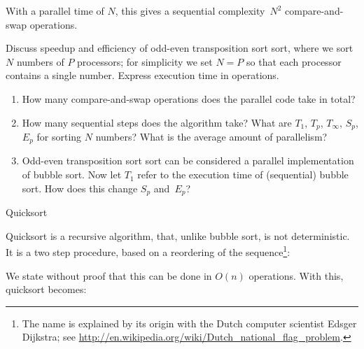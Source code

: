With a parallel time of $N$, this gives a sequential complexity~$N^2$
compare-and-swap operations.

\begin{exercise}
  \label{ex:swapsort}
  Discuss speedup and efficiency of odd-even transposition sort sort, where we sort $N$
  numbers of $P$ processors; for simplicity we set $N=P$ so that
  each processor contains a single number. Express execution time
  in  operations.
  \begin{enumerate}
  \item How many compare-and-swap operations does the parallel code
    take in total?
  \item How many sequential steps does the algorithm take? What are
    $T_1$, $T_p$, $T_\infty$, $S_p$, $E_p$ for sorting $N$ numbers?
    What is the average amount of parallelism?
  \item Odd-even transposition sort sort can be considered a parallel implementation of
    bubble sort. Now let $T_1$ refer to the execution time of
    (sequential) bubble sort. How does this change $S_p$ and~$E_p$?
  \end{enumerate}
\end{exercise}


 {Quicksort}
\label{sec:quicksort}

Quicksort is a recursive algorithm, that, unlike bubble sort, is not
deterministic. It is a two step procedure, based on a reordering of
the sequence\footnote{The name is explained by its origin with the
  Dutch computer scientist Edsger Dijkstra; see
  \url{http://en.wikipedia.org/wiki/Dutch_national_flag_problem}.}:

\begin{displayalgorithm}
\end{displayalgorithm}

We state without proof that this can be done in $O(n)$ operations.
With this, quicksort becomes:

\begin{displayalgorithm}
\end{displayalgorithm}

